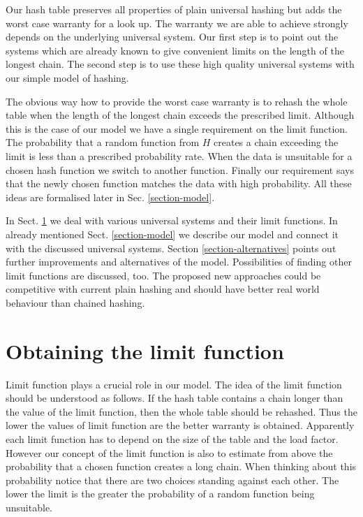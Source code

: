 \documentclass[runningheads,a4paper]{llncs}
\begin{document}
Our hash table preserves all properties of plain universal hashing but adds the worst case warranty for a look up. The warranty we are able to achieve strongly depends on the underlying universal system. Our first step is to point out the systems which are already known to give convenient limits on the length of the longest chain. The second step is to use these high quality universal systems with our simple model of hashing.

The obvious way how to provide the worst case warranty is to rehash the whole table when the length of the longest chain exceeds the prescribed limit. Although this is the case of our model we have a single requirement on the limit function. The probability that a random function from $H$ creates a chain exceeding the limit is less than a prescribed probability rate. When the data is unsuitable for a chosen hash function we switch to another function. Finally our requirement says that the newly chosen function matches the data with high probability. All these ideas are formalised later in Sec. \ref{section-model}.

In Sect. \ref{section-limit} we deal with various universal systems and their limit functions. In already mentioned Sect. \ref{section-model} we describe our model and connect it with the discussed universal systems. Section \ref{section-alternatives} points out further improvements and alternatives of the model. Possibilities of finding other limit functions are discussed, too. The proposed new approaches could be competitive with current plain hashing and should have better real world behaviour than chained hashing.

\section{Obtaining the limit function}
\label{section-limit}
Limit function plays a crucial role in our model. The idea of the limit function should be understood as follows. If the hash table contains a chain longer than the value of the limit function, then the whole table should be rehashed. Thus the lower the values of limit function are the better warranty is obtained. Apparently each limit function has to depend on the size of the table and the load factor. However our concept of the limit function is also to estimate from above the probability that a chosen function creates a long chain. When thinking about this probability notice that there are two choices standing against each other. The lower the limit is the greater the probability of a random function being unsuitable.
\end{document}
